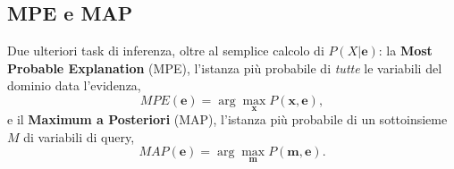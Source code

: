 \documentclass[a4paper,11pt]{article}
\begin{document}
\subsection{MPE e MAP}

Due ulteriori task di inferenza, oltre al semplice calcolo di $P(X|\mathbf{e})$: la \textbf{Most Probable Explanation} (MPE), l'istanza più probabile di \emph{tutte} le variabili del dominio data l'evidenza,
\[
MPE(\mathbf{e}) = \arg\max_{\mathbf{x}} P(\mathbf{x},\mathbf{e}),
\]
e il \textbf{Maximum a Posteriori} (MAP), l'istanza più probabile di un sottoinsieme $M$ di variabili di query,
\[
MAP(\mathbf{e}) = \arg\max_{\mathbf{m}} P(\mathbf{m},\mathbf{e}).
\]
\end{document}
